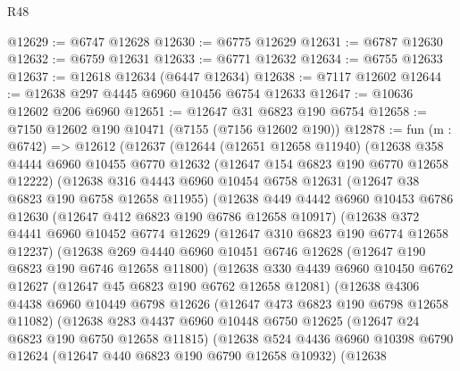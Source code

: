 \begin{lexlean}{R48}
\begin{coremodule}
@12629 := @6747 @12628
@12630 := @6775 @12629
@12631 := @6787 @12630
@12632 := @6759 @12631
@12633 := @6771 @12632
@12634 := @6755 @12633
@12637 := @12618 @12634 (@6447 @12634)
@12638 := @7117 @12602
@12644 := @12638 @297 @4445 @6960 @10456 @6754 @12633
@12647 := @10636 @12602 @206 @6960
@12651 := @12647 @31 @6823 @190 @6754
@12658 := @7150 @12602 @190 @10471 (@7155 (@7156 @12602 @190))
@12878 := fun (m : @6742) =>
  @12612
    (@12637
      (@12644
        (@12651 @12658 @11940)
        (@12638
          @358
          @4444
          @6960
          @10455
          @6770
          @12632
          (@12647 @154 @6823 @190 @6770 @12658 @12222)
          (@12638
            @316
            @4443
            @6960
            @10454
            @6758
            @12631
            (@12647 @38 @6823 @190 @6758 @12658 @11955)
            (@12638
              @449
              @4442
              @6960
              @10453
              @6786
              @12630
              (@12647 @412 @6823 @190 @6786 @12658 @10917)
              (@12638
                @372
                @4441
                @6960
                @10452
                @6774
                @12629
                (@12647 @310 @6823 @190 @6774 @12658 @12237)
                (@12638
                  @269
                  @4440
                  @6960
                  @10451
                  @6746
                  @12628
                  (@12647 @190 @6823 @190 @6746 @12658 @11800)
                  (@12638
                    @330
                    @4439
                    @6960
                    @10450
                    @6762
                    @12627
                    (@12647 @45 @6823 @190 @6762 @12658 @12081)
                    (@12638
                      @4306
                      @4438
                      @6960
                      @10449
                      @6798
                      @12626
                      (@12647 @473 @6823 @190 @6798 @12658 @11082)
                      (@12638
                        @283
                        @4437
                        @6960
                        @10448
                        @6750
                        @12625
                        (@12647 @24 @6823 @190 @6750 @12658 @11815)
                        (@12638
                          @524
                          @4436
                          @6960
                          @10398
                          @6790
                          @12624
                          (@12647 @440 @6823 @190 @6790 @12658 @10932)
                          (@12638

\end{coremodule}
\end{lexlean}
